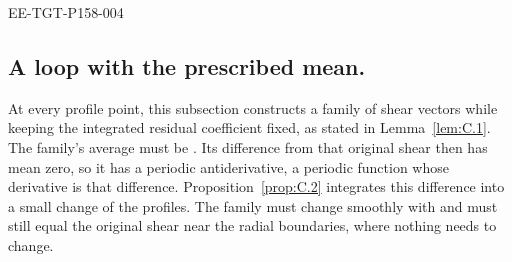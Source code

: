 \begin{EESegment}{EE-TGT-P158-004}
\subsection{A loop with the prescribed mean.}\label{sec:C.1}
At every profile point, this subsection constructs a family
 of shear vectors while keeping the integrated residual coefficient
fixed, as stated in Lemma~\ref{lem:C.1}. The family's average must be . Its difference from that original shear then has mean zero, so it has a periodic antiderivative, a periodic function whose derivative is that difference. Proposition~\ref{prop:C.2} integrates this difference into a
small change of the profiles. The family must change smoothly with  and must still equal
the original shear near the radial boundaries, where nothing needs to change.
\end{EESegment}

